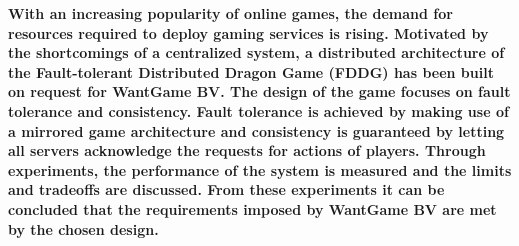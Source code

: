 \textbf{With an increasing popularity of online games, the demand for resources required to deploy gaming services is rising.
	Motivated by the shortcomings of a centralized system, a distributed architecture of the Fault-tolerant Distributed Dragon Game (FDDG) has been built on request for WantGame BV. 
	The design of the game focuses on fault tolerance and consistency.
	Fault tolerance is achieved by making use of a mirrored game architecture and consistency is guaranteed by letting all servers acknowledge the requests for actions of players. 
	Through experiments, the performance of the system is measured and the limits and tradeoffs are discussed.
	From these experiments it can be concluded that the requirements imposed by WantGame BV are met by the chosen design.}